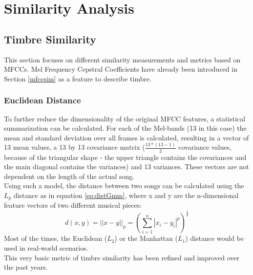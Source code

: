 
\chapter{Similarity Analysis}\label{simanal}


\section{Timbre Similarity} \label{musly}

This section focuses on different similarity measurements and metrics based on MFCCs. Mel Frequency Cepstral Coefficients have already been introduced in Section \ref{mfccsim} as a feature to describe timbre.\\

\subsection{Euclidean Distance}\label{mfcceuc}

To further reduce the dimensionality of the original MFCC features, a statistical summarization can be calculated. For each of the Mel-bands (13 in this case) the mean and standard deviation over all frames is calculated, resulting in a vector of 13 mean values, a 13 by 13 covariance matrix ($\frac{13*(13-1)}{2}$ covariance values, because of the triangular shape - the upper triangle contains the covariances and the main diagonal contains the variances) and 13 variances. These vectors are not dependent on the length of the actual song. \cite[pp. 51ff]{knees1}\\
Using such a model, the distance between two songs can be calculated using the $L_p$ distance as in equation \eqref{eq:distGmm}, where x and y are the n-dimensional feature vectors of two different musical pieces:
\begin{equation} \label{eq:distGmm}
d(x, y) = ||x - y||_p = \left(\sum_{i=1}^{n}{|x_i - y_i|^p}\right)^{\frac{1}{p}}
\end{equation}
Most of the times, the Euclidean ($L_2$) or the Manhattan ($L_1$) distance would be used in real-world scenarios. \cite[p. 58]{knees1}\\
This very basic metric of timbre similarity has been refined and improved over the past years.

